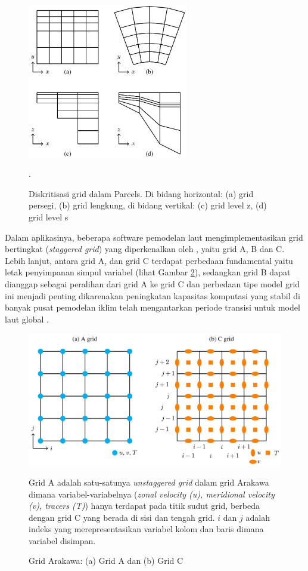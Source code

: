 \begin{spacing}{1.5}
	\begin{figure}[H]
		\centering
		\includegraphics[width=7cm]{contents/grid.jpg}
		\caption{Diskritisasi grid dalam Parcels. Di bidang horizontal: (a) grid persegi, (b) grid lengkung, di bidang vertikal: (c) grid level z, (d) grid level s \protect{}}.
		\label{fig:grid}
	\end{figure}
	
	Dalam aplikasinya, beberapa software pemodelan laut mengimplementasikan grid bertingkat (\textit{staggered grid}) yang diperkenalkan oleh , yaitu grid A, B dan C. Lebih lanjut, antara grid A, dan grid C terdapat perbedaan fundamental yaitu letak penyimpanan simpul variabel (lihat Gambar \ref{fig:arakawa}), sedangkan grid B dapat dianggap sebagai peralihan dari grid A ke grid C dan perbedaan tipe model grid ini menjadi penting dikarenakan peningkatan kapasitas komputasi yang stabil di banyak pusat pemodelan iklim telah mengantarkan periode transisi untuk model laut global  . 
	
	\begin{figure}[H]
		\centering
		\includegraphics[width=13cm]{contents/arakawa.jpg}
		\caption{Grid Arakawa: (a) Grid A dan (b) Grid C \protect{}}
		\label{fig:arakawa}
		\medspace
		\small
		Grid A adalah satu-satunya \textit{unstaggered grid} dalam grid Arakawa dimana variabel-variabelnya (\textit{zonal velocity (u), meridional velocity (v), tracers (T)}) hanya terdapat pada titik sudut grid, berbeda dengan grid C yang berada di sisi dan tengah grid. $i$ dan $j$ adalah indeks yang merepresentasikan variabel kolom dan baris dimana variabel disimpan.
	\end{figure}
\end{spacing}
\vspace{-0.1pc}
